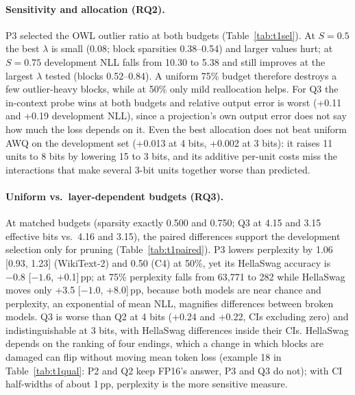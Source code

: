 \documentclass{article}
\begin{document}
\paragraph{Sensitivity and allocation (RQ2).}
P3 selected the OWL outlier ratio at both budgets (Table~\ref{tab:t1sel}). At $S=0.5$ the best $\lambda$ is small (0.08;
block sparsities 0.38--0.54) and larger values hurt; at $S=0.75$ development NLL falls from 10.30 to 5.38 and still
improves at the largest $\lambda$ tested (blocks 0.52--0.84). A uniform 75\% budget therefore destroys a few outlier-heavy
blocks, while at 50\% only mild reallocation helps. For Q3 the in-context probe wins at both budgets and relative output
error is worst (+0.11 and +0.19 development NLL), since a projection's own output error does not say how much the loss
depends on it. Even the best allocation does not beat uniform AWQ on the development set (+0.013 at 4 bits, +0.002 at
3 bits): it raises 11 units to 8 bits by lowering 15 to 3 bits, and its additive per-unit costs miss the interactions
that make several 3-bit units together worse than predicted.

\paragraph{Uniform vs.\ layer-dependent budgets (RQ3).}
At matched budgets (sparsity exactly 0.500 and 0.750; Q3 at 4.15 and 3.15 effective bits vs.\ 4.16 and 3.15), the paired
differences support the development selection only for pruning (Table~\ref{tab:t1paired}). P3 lowers perplexity by
1.06 [0.93, 1.23] (WikiText-2) and 0.50 (C4) at 50\%, yet its HellaSwag accuracy is $-0.8$ [$-1.6$, +0.1]\,pp; at 75\%
perplexity falls from 63,771 to 282 while HellaSwag moves only +3.5 [$-1.0$, +8.0]\,pp, because both models are near
chance and perplexity, an exponential of mean NLL, magnifies differences between broken models. Q3 is worse than Q2 at
4 bits (+0.24 and +0.22, CIs excluding zero) and indistinguishable at 3 bits, with HellaSwag differences inside their CIs.
HellaSwag depends on the ranking of four endings, which a change in which blocks are damaged can flip without moving
mean token loss (example 18 in Table~\ref{tab:t1qual}: P2 and Q2 keep FP16's answer, P3 and Q3 do not); with CI
half-widths of about 1\,pp, perplexity is the more sensitive measure.
\end{document}
